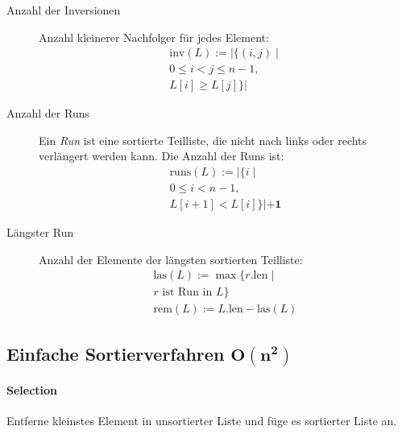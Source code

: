 \begin{mzImportant}
  \begin{description}
    \item [Anzahl der Inversionen]
          Anzahl kleinerer Nachfolger für jedes Element:
          \begin{gather*}
            \text{inv} (L) := |\{ (i,j) \mid \\
            0 \leq i < j \leq n - 1, \\
            L[i] \geq L[j] \}|
          \end{gather*}

    \item [Anzahl der Runs]
          Ein \emph{Run} ist eine sortierte Teilliste, die nicht nach links oder rechts verlängert werden kann.
          Die Anzahl der Runs ist:
          \begin{gather*}
            \text{runs} (L) := |\{ i \mid \\
            0 \leq i < n - 1, \\
            L[i + 1] < L[i]  \}| \mathbf{+ 1}
          \end{gather*}

    \item [Längster Run]
          Anzahl der Elemente der längsten sortierten Teilliste:
          \begin{gather*}
            \text{las} (L) := \max \{ r.\text{len} \mid \\
            r \text{ ist Run in } L \} \\
            \text{rem} (L) := L.\text{len} - \text{las} (L)
          \end{gather*}
  \end{description}
\end{mzImportant}

\subsection{Einfache Sortierverfahren $\mathbf{O(n^2)}$}

\paragraph{Selection}
Entferne kleinstes Element in unsortierter Liste und füge es sortierter Liste an.


